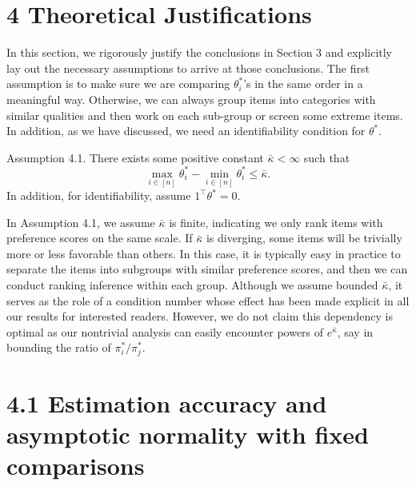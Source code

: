 


\section{4 Theoretical Justifications}\label{theoretical-justifications}

In this section, we rigorously justify the conclusions in Section 3 and explicitly lay out the necessary assumptions to arrive at those conclusions. The first assumption is to make sure we are comparing \(\theta_{i}^{*}\)'s in the same order in a meaningful way. Otherwise, we can always group items into categories with similar qualities and then work on each sub-group or screen some extreme items. In addition, as we have discussed, we need an identifiability condition for \(\theta^{*}\).

Assumption 4.1. There exists some positive constant \(\bar{\kappa} < \infty\) such that
\[
\max_{i\in [n]}\theta_{i}^{*} - \min_{i\in [n]}\theta_{i}^{*}\leq \bar{\kappa}.
\]
In addition, for identifiability, assume \(1^{\top}\theta^{*} = 0\).

In Assumption 4.1, we assume \(\bar{\kappa}\) is finite, indicating we only rank items with preference scores on the same scale. If \(\bar{\kappa}\) is diverging, some items will be trivially more or less favorable than others. In this case, it is typically easy in practice to separate the items into subgroups with similar preference scores, and then we can conduct ranking inference within each group. Although we assume bounded \(\bar{\kappa}\), it serves as the role of a condition number whose effect has been made explicit in all our results for interested readers. However, we do not claim this dependency is optimal as our nontrivial analysis can easily encounter powers of \(e^{\bar{\kappa}}\), say in bounding the ratio of \(\pi_{i}^{*} / \pi_{j}^{*}\).

\section{4.1 Estimation accuracy and asymptotic normality with fixed comparisons}\label{estimation-accuracy-and-asymptotic-normality-with-fixed-comparisons}

